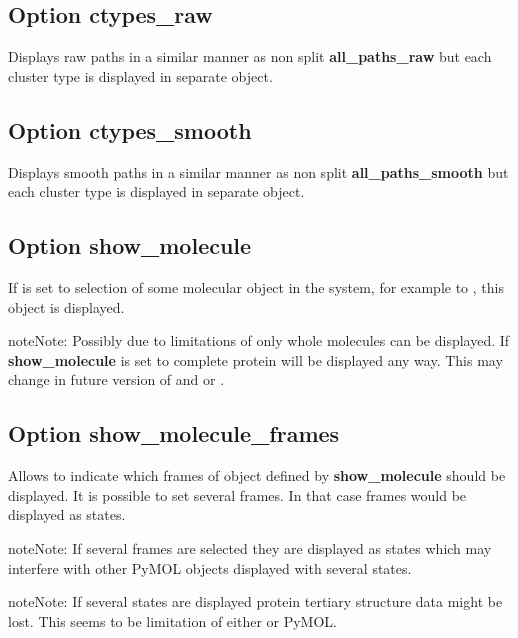 \documentclass[a4paper,10pt,english]{sphinxmanual}
\begin{document}
\subsection{Option \textbf{ctypes\_raw}}
\label{valve/valve_config:option-ctypes-raw}
Displays raw paths in a similar manner as non split \textbf{all\_paths\_raw} but each cluster type is displayed in separate object.


\subsection{Option \textbf{ctypes\_smooth}}
\label{valve/valve_config:option-ctypes-smooth}
Displays smooth paths in a similar manner as non split \textbf{all\_paths\_smooth} but each cluster type is displayed in separate object.


\subsection{Option \textbf{show\_molecule}}
\label{valve/valve_config:option-show-molecule}
If is set to selection of some molecular object in the system, for example to , this object is displayed.

\begin{notice}{note}{Note:}
Possibly due to limitations of  only whole molecules can be displayed. If \textbf{show\_molecule} is set to  complete protein will be displayed any way. This may change in future version of  and or {\hyperref[aqueduct:module\string-aqueduct]{}}.
\end{notice}


\subsection{Option \textbf{show\_molecule\_frames}}
\label{valve/valve_config:option-show-molecule-frames}
Allows to indicate which frames of object defined by \textbf{show\_molecule} should be displayed. It is possible to set several frames. In that case frames would be displayed as states.

\begin{notice}{note}{Note:}
If several frames are selected they are displayed as states which may interfere with other PyMOL objects displayed with several states.
\end{notice}

\begin{notice}{note}{Note:}
If several states are displayed protein tertiary structure data might be lost. This seems to be limitation of either  or PyMOL.
\end{notice}
\end{document}
